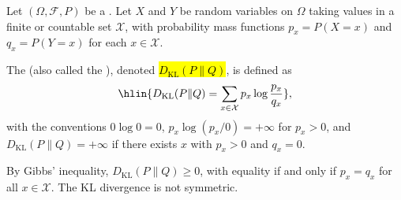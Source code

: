 \begin{definition} \label{definition:kullback_leibler_divergence_between_two_probability_distributions}
Let $(\Omega, \mathcal{F}, P)$ be a . Let $X$ and $Y$ be random variables on $\Omega$ taking values in a finite or countable set $\mathcal{X}$, with probability mass functions $p_x = P(X = x)$ and $q_x = P(Y = x)$ for each $x \in \mathcal{X}$.

The  (also called the ), denoted \hl{$D_{\mathrm{KL}}(P \| Q)$}, is defined as
$$\hlin{D_{\mathrm{KL}}(P \| Q) = \sum_{x \in \mathcal{X}} p_x \log \frac{p_x}{q_x}},$$
with the conventions $0 \log 0 = 0$, $p_x \log(p_x / 0) = +\infty$ for $p_x > 0$, and $D_{\mathrm{KL}}(P \| Q) = +\infty$ if there exists $x$ with $p_x > 0$ and $q_x = 0$.

By Gibbs' inequality, $D_{\mathrm{KL}}(P \| Q) \geq 0$, with equality if and only if $p_x = q_x$ for all $x \in \mathcal{X}$. The KL divergence is not symmetric.
\end{definition}
